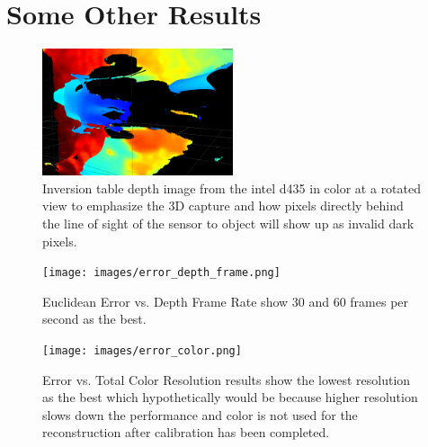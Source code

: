 
\chapter{Some Other Results}

\begin{figure}[h]
        \caption{Inversion table depth image from the intel d435 in color at a rotated view to emphasize the 3D capture and how pixels directly behind the line of sight of the sensor to object will show up as invalid dark pixels.}
        \centering
        \includegraphics[width=0.5\textwidth]{images/inversion_depth.png}
\end{figure}
 
\begin{figure}[h]
        \caption{Euclidean Error vs. Depth Frame Rate show 30 and 60 frames per second as the best.}
        \centering
        \texttt{[image: images/error\_depth\_frame.png]}
\end{figure}
 
\begin{figure}[h]
        \caption{Error vs. Total Color Resolution results show the lowest resolution as the best which hypothetically would be because higher resolution slows down the performance and color is not used for the reconstruction after calibration has been completed.}
        \centering
        \texttt{[image: images/error\_color.png]}
\end{figure}
 

